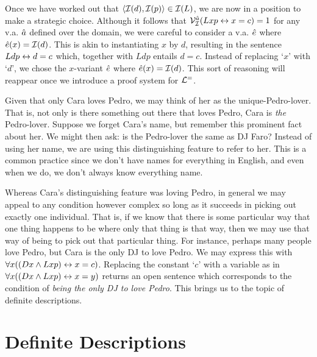 Once we have worked out that $\langle\mathcal{I}(d),\mathcal{I}(p)\rangle\in\mathcal{I}(L)$, we are now in a position to make a strategic choice.
Although it follows that $\mathcal{V}_{\mathcal{I}}^{\hat{a}}(Lxp \leftrightarrow x=c)=1$ for any v.a. $\hat{a}$ defined over the domain, we were careful to consider a v.a. $\hat{e}$ where $\hat{e}(x)=\mathcal{I}(d)$.
This is akin to instantiating $x$ by $d$, resulting in the sentence $Ldp \leftrightarrow d=c$ which, together with $Ldp$ entails $d=c$.
Instead of replacing `$x$' with `$d$', we chose the $x$-variant $\hat{e}$ where $\hat{e}(x)=\mathcal{I}(d)$.
This sort of reasoning will reappear once we introduce a proof system for $\mathcal{L}^{=}$.

Given that only Cara loves Pedro, we may think of her as the unique-Pedro-lover.
That is, not only is there something out there that loves Pedro, Cara is \textit{the} Pedro-lover.
Suppose we forget Cara's name, but remember this prominent fact about her.
We might then ask: is the Pedro-lover the same as DJ Faro?
Instead of using her name, we are using this distinguishing feature to refer to her.
This is a common practice since we don't have names for everything in English, and even when we do, we don't always know everything name.

Whereas Cara's distinguishing feature was loving Pedro, in general we may appeal to any condition however complex so long as it succeeds in picking out exactly one individual.
That is, if we know that there is some particular way that one thing happens to be where only that thing is that way, then we may use that way of being to pick out that particular thing.
For instance, perhaps many people love Pedro, but Cara is the only DJ to love Pedro.
We may express this with $\forall x((Dx \wedge Lxp) \leftrightarrow x=c)$.
Replacing the constant `$c$' with a variable as in $\forall x((Dx \wedge Lxp) \leftrightarrow x=y)$ returns an open sentence which corresponds to the condition of \textit{being the only DJ to love Pedro}.
This brings us to the topic of definite descriptions.






\section{Definite Descriptions}
  \label{sec.DefiniteDescription}


